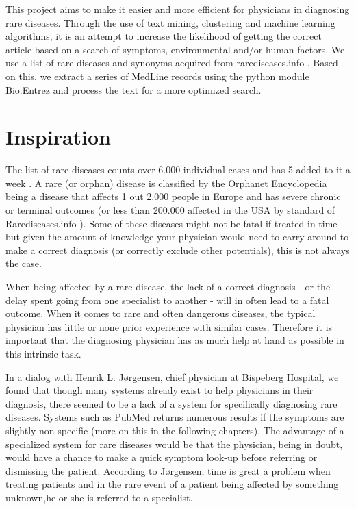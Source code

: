 This project aims to make it easier and more efficient for physicians
in diagnosing rare diseases. Through the use of text mining,
clustering and machine learning algorithms, it is an attempt to
increase the likelihood of getting the correct article based on a
search of symptoms, environmental and/or human factors. We use a list
of rare diseases and synonyms acquired from rarediseases.info
\cite{Rarediseases}. Based on this, we
extract a series of MedLine records \cite{PubMedFactSheetMedline}
using the python module Bio.Entrez \cite{EntrezProgUtil} and process
the text for a more optimized search.

\section{Inspiration}

The list of rare diseases counts over 6.000 individual cases and has 5
added to it a week \cite{AboutRareDiseasesOrphanet}. A rare (or
orphan) disease is classified by the Orphanet Encyclopedia
\cite{OrphanetEncyclopedia} being a disease that affects 1 out 2.000
people in Europe and has severe chronic or terminal outcomes (or less
than 200.000 affected in the USA by standard of
Rarediseases.info \cite{Rarediseases}). Some
of these diseases might not be fatal if treated in time but given the
amount of knowledge your physician would need to carry around to make
a correct diagnosis (or correctly exclude other potentials), this is
not always the case.

When being affected by a rare disease, the lack of a correct diagnosis
- or the delay spent going from one specialist to another - will in
often lead to a fatal outcome. When it comes to rare and often
dangerous diseases, the typical physician has little or none prior
experience with similar cases. Therefore it is important that the
diagnosing physician has as much help at hand as possible in this
intrinsic task.

In a dialog with Henrik L. Jørgensen, chief physician at Bispeberg
Hospital, we found that though many systems already exist to help
physicians in their diagnosis, there seemed to be a lack of a system
for specifically diagnosing rare diseases. Systems such as PubMed
returns numerous results if the symptoms are slightly non-specific
(more on this in the following chapters). The advantage of a
specialized system for rare diseases would be that the physician,
being in doubt, would have a chance to make a quick symptom look-up
before referring or dismissing the patient. According to Jørgensen,
time is great a problem when treating patients and in the rare event
of a patient being affected by something unknown,he or she is referred
to a specialist.


